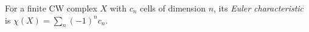 
For a finite CW complex $X$ with $c_n$ cells of dimension $n$, its \emph{Euler characteristic} is $\chi(X)=\sum_n(-1)^nc_n$.
